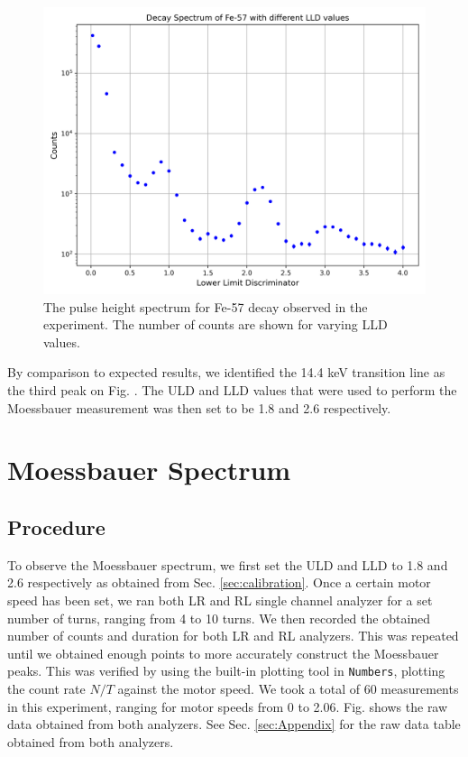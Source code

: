 \documentclass[a4paper]{report}
\numberwithin{equation}{section}
\begin{document}
\begin{figure}[htb!]
	\centering
	\includegraphics[width=0.7\columnwidth]{calib_plot.png}

	\caption{The pulse height spectrum for Fe-57 decay observed in the experiment. The number of counts are shown for varying 
	LLD values.
	}
	\label{fig:calib_plot}
\end{figure}

By comparison to expected results, we identified the 14.4 keV transition line as the third peak on Fig. \label{fig:calib_plot}. 
The ULD and LLD values that were used to perform the Moessbauer measurement was then set to be 1.8 and 2.6 respectively. \par 



\chapter{Moessbauer Spectrum}

\section{Procedure}

To observe the Moessbauer spectrum, we first set the ULD and LLD to 1.8 and 2.6 respectively as obtained from Sec. \ref{sec:calibration}. 
Once a certain motor speed has been set, we ran both LR and RL single channel analyzer for a set number of turns, ranging from 4 to 10
turns. We then recorded the obtained number of counts and duration for both LR and RL analyzers. This was repeated until we obtained 
enough points to more accurately construct the Moessbauer peaks. This was verified by using the built-in plotting tool in \texttt{Numbers}, 
plotting the count rate $N / T$ against the motor speed. We took a total of 60 measurements in this experiment, ranging for 
motor speeds from 0 to 2.06. Fig. shows the raw data obtained from both analyzers. See Sec. \ref{sec:Appendix} for the raw data table obtained from both analyzers. \par 
\end{document}
